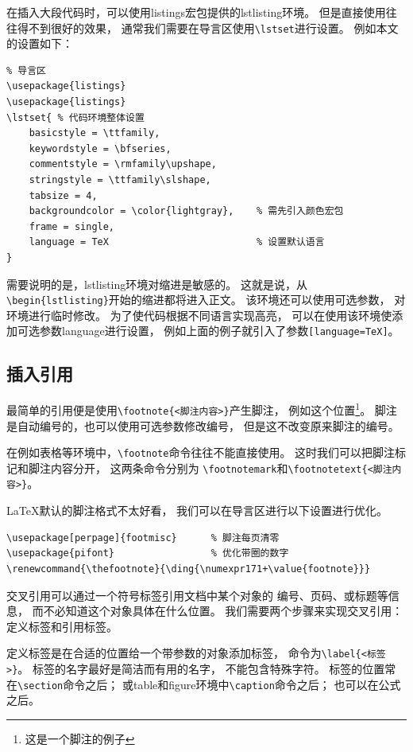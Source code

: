 \documentclass{ctexart}
\numberwithin{equation}{section}			%
\renewcommand{\thefootnote}{\ding{\numexpr171+\value{footnote}}}
\begin{document}
	在插入大段代码时，可以使用listings宏包提供的lstlisting环境。
	但是直接使用往往得不到很好的效果，
	通常我们需要在导言区使用\verb|\lstset|进行设置。
	例如本文的设置如下：

\begin{lstlisting}
% 导言区
\usepackage{listings}
\usepackage{listings}
\lstset{ % 代码环境整体设置
	basicstyle = \ttfamily,
	keywordstyle = \bfseries,
	commentstyle = \rmfamily\upshape,
	stringstyle = \ttfamily\slshape,
	tabsize = 4,
	backgroundcolor = \color{lightgray},	% 需先引入颜色宏包
	frame = single,
	language = TeX							% 设置默认语言
}
\end{lstlisting}
	
	需要说明的是，lstlisting环境对缩进是敏感的。
	这就是说，从\verb|\begin{lstlisting}|开始的缩进都将进入正文。
	该环境还可以使用可选参数，
	对环境进行临时修改。
	为了使代码根据不同语言实现高亮，
	可以在使用该环境使添加可选参数language进行设置，
	例如上面的例子就引入了参数\verb|[language=TeX]|。
	
	\subsection{插入引用}
	最简单的引用便是使用\verb|\footnote{<脚注内容>}|产生脚注，
	例如这个位置\footnote{这是一个脚注的例子}。
	脚注是自动编号的，也可以使用可选参数修改编号，
	但是这不改变原来脚注的编号。
	
	在例如表格等环境中，\verb|\footnote|命令往往不能直接使用。
	这时我们可以把脚注标记和脚注内容分开\footnotemark，
	这两条命令分别为
	\verb|\footnotemark|和\verb|\footnotetext{<脚注内容>}|。
	
	\LaTeX 默认的脚注格式不太好看，
	我们可以在导言区进行以下设置进行优化。
	
\begin{lstlisting}
\usepackage[perpage]{footmisc}		% 脚注每页清零
\usepackage{pifont}					% 优化带圈的数字
\renewcommand{\thefootnote}{\ding{\numexpr171+\value{footnote}}}
\end{lstlisting}
	
	交叉引用可以通过一个符号标签引用文档中某个对象的
	编号、页码、或标题等信息，
	而不必知道这个对象具体在什么位置。
	我们需要两个步骤来实现交叉引用：
	定义标签和引用标签。
	
	定义标签是在合适的位置给一个带参数的对象添加标签，
	命令为\verb|\label{<标签>}|。
	标签的名字最好是简洁而有用的名字，
	不能包含特殊字符。
	标签的位置常在\verb|\section|命令之后；
	或table和figure环境中\verb|\caption|命令之后；
	也可以在公式之后。
	
\end{document}
